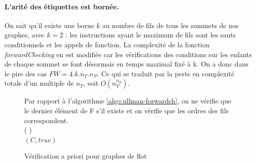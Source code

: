 \paragraph{L'arité des étiquettes est bornée.}
On sait qu'il existe une borne $k$ au nombre de fils de tous les sommets de nos graphes, avec $k=2$ : les instructions ayant le maximum de fils sont les sauts conditionnels et les appels de fonction.
La complexité de la fonction \emph{forwardChecking} en est modifiée car les vérifications des conditions sur les enfants de chaque sommet se font désormais en temps maximal fixé à k. On a donc dans le pire des cas $FW=4.k.n_T.n_P$. Ce qui se traduit par la perte en complexité totale d'un
multiple de $n_T$, soit $O(n_T^{n_P})$.

\begin{figure}
\begin{algorithm}[H] %
\caption{Vérification a priori pour graphes de flot}
\SetAlgoLined
Par rapport à l'algorithme \ref{algo:ullman-forwardch}, on ne vérifie que le dernier élément de F s'il existe et on vérifie que les ordres des fils correspondent.\\
\Fn(
){}{
\\
\Return $(C, true)$
}
\label{algo:ullman-forwardch-site}
\end{algorithm}
\end{figure}

